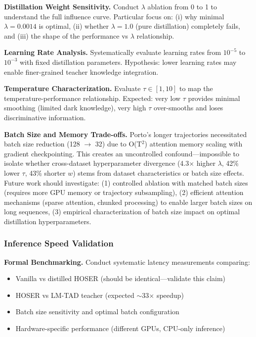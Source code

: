 \textbf{Distillation Weight Sensitivity.} Conduct $\lambda$ ablation from 0 to 1 to understand the full influence curve. Particular focus on: (i) why minimal $\lambda = 0.0014$ is optimal, (ii) whether $\lambda = 1.0$ (pure distillation) completely fails, and (iii) the shape of the performance vs $\lambda$ relationship.

\textbf{Learning Rate Analysis.} Systematically evaluate learning rates from $10^{-5}$ to $10^{-3}$ with fixed distillation parameters. Hypothesis: lower learning rates may enable finer-grained teacher knowledge integration.

\textbf{Temperature Characterization.} Evaluate $\tau \in [1, 10]$ to map the temperature-performance relationship. Expected: very low $\tau$ provides minimal smoothing (limited dark knowledge), very high $\tau$ over-smooths and loses discriminative information.

\textbf{Batch Size and Memory Trade-offs.} Porto's longer trajectories necessitated batch size reduction (128 $\to$ 32) due to O(T$^2$) attention memory scaling with gradient checkpointing. This creates an uncontrolled confound---impossible to isolate whether cross-dataset hyperparameter divergence (4.3$\times$ higher $\lambda$, 42\% lower $\tau$, 43\% shorter $w$) stems from dataset characteristics or batch size effects. Future work should investigate: (1) controlled ablation with matched batch sizes (requires more GPU memory or trajectory subsampling), (2) efficient attention mechanisms (sparse attention, chunked processing) to enable larger batch sizes on long sequences, (3) empirical characterization of batch size impact on optimal distillation hyperparameters.

\subsubsection{Inference Speed Validation}

\textbf{Formal Benchmarking.} Conduct systematic latency measurements comparing:
\begin{itemize}[noitemsep,topsep=0pt]
    \item Vanilla vs distilled HOSER (should be identical—validate this claim)
    \item HOSER vs LM-TAD teacher (expected $\sim$33$\times$ speedup)
    \item Batch size sensitivity and optimal batch configuration
    \item Hardware-specific performance (different GPUs, CPU-only inference)
\end{itemize}

